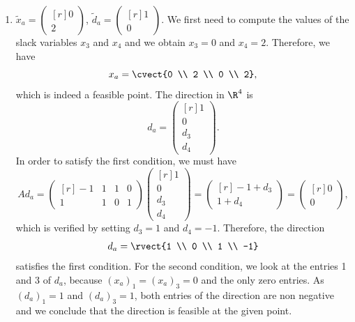     \begin{enumerate}
        \item $\tilde{x}_a = \begin{pmatrix*}[r] 0 \\ 2 \end{pmatrix*}$, $\tilde{d}_a = \begin{pmatrix*}[r] 1 \\ 0 \end{pmatrix*}.$ \vspace{0.5em} \newline
        We first need to compute the values of the slack variables
        $x_3$ and $x_4$ and we obtain $x_3 = 0$ and $x_4 =
        2$. Therefore, we have
        \[
       x_a = \cvect{0 \\ 2 \\ 0 \\ 2},
       \]
       which is indeed a feasible point. The direction in $\R^4$ is
       \[
       d_a = \begin{pmatrix*}[r] 1 \\ 0 \\ d_3 \\ d_4 \end{pmatrix*}.
       \]
        In order to satisfy the first condition, we must have
        \begin{equation*}
        Ad_a = \begin{pmatrix*}[r] -1 & 1 & 1 & 0 \\ 1 & 1 & 0 & 1 \end{pmatrix*} \begin{pmatrix*}[r] 1 \\ 0 \\ d_3 \\ d_4 \end{pmatrix*} = \begin{pmatrix*}[r] -1 + d_3 \\ 1 + d_4 \end{pmatrix*} = \begin{pmatrix*}[r] 0 \\ 0 \end{pmatrix*},
        \end{equation*}
        which is verified by setting $d_3 = 1$ and $d_4 =
        -1$. Therefore, the direction
        \[
d_a = \rvect{1 \\ 0 \\ 1 \\ -1}
        \]
        satisfies the first condition. For the second condition, we look
        at the entries 1 and 3 of $d_a$, because $(x_a)_1=(x_a)_3=0$
        and the only zero entries. As
        $(d_a)_1=1$ and $(d_a)_3=1$, both entries of the direction
        are non negative and we conclude that the direction is feasible
        at the given point. 
        

\end{enumerate}
